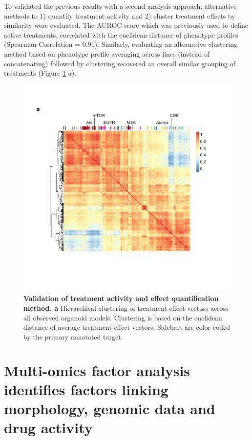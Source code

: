 \begin{flushleft}
To validated the previous results with a second analysis approach, alternative methods to 1) quantify treatment activity and 2) cluster treatment effects by similarity were evaluated. The AUROC score which was previously used to define active treatments, correlated with the euclidean distance of phenotype profiles (Spearman Correlation = 0.91). Similarly, evaluating an alternative clustering method based on phenotype profile averaging across lines (instead of concatenating) followed by clustering recovered an overall similar grouping of treatments (Figure \ref{fig_232} a). 

\begin{figure}[H]
\centering
\includegraphics[width=\textwidth,
                height=\textheight,
                keepaspectratio]{figures/promise/pdf/fig_3_2.pdf}
\caption[Validation of treatment activity and effect quantification method]{\textbf{Validation of treatment activity and effect quantification method. a} Hierarchical clustering of treatment effect vectors across all observed organoid models. Clustering is based on the euclidean distance of average treatment effect vectors. Sidebars are color-coded by the primary annotated target.}
\label{fig_232}
\end{figure}
\bigbreak

\newpage

\section{Multi-omics factor analysis identifies factors linking morphology, genomic data and drug activity}


\end{flushleft}
